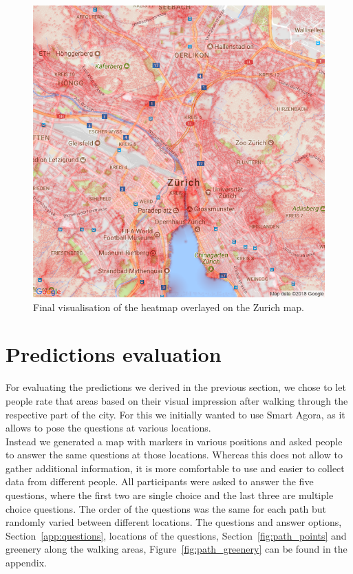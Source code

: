 \documentclass[letterpaper]{article}
\begin{document}
\begin{figure}
    \centering
     \includegraphics[width=.95\linewidth]{images/combined.png}
    \caption{Final visualisation of the heatmap overlayed on the Zurich map.}
    \label{fig:ZurichVisualization}
\end{figure}

\section{Predictions evaluation}\label{sec:exp}
For evaluating the predictions we derived in the previous section, we chose to let people rate
that areas based on their visual impression after walking through the respective part of the city.
For this we initially wanted to use Smart Agora, as it allows to pose the questions at various locations.\\

\indent Instead we generated a map with markers in various positions and asked people to answer the same questions at those locations.
Whereas this does not allow to gather additional information, it is more comfortable to use and easier to collect data from
different people. All participants were asked to answer the five questions, where the first two are single choice
and the last three are multiple choice questions. The order of the questions was the same for each path but randomly varied
between different locations. The questions and answer options, Section~\ref{app:questions}, locations of the questions, Section~\ref{fig:path_points}
and greenery along the walking areas, Figure~\ref{fig:path_greenery} can be found in the appendix.\\
\end{document}
